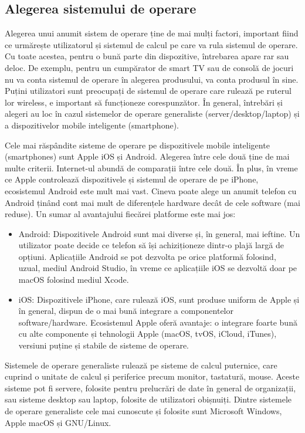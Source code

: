 \subsection{Alegerea sistemului de operare}
\label{sec:intro:pick}

Alegerea unui anumit sistem de operare ține de mai mulți factori, important fiind ce urmărește utilizatorul și sistemul de calcul pe care va rula sistemul de operare. Cu toate acestea, pentru o bună parte din dispozitive, întrebarea apare rar sau deloc. De exemplu, pentru un cumpărator de smart TV sau de consolă de jocuri nu va conta sistemul de operare în alegerea produsului, va conta produsul în sine. Puțini utilizatori sunt preocupați de sistemul de operare care rulează pe ruterul lor wireless, e important să funcționeze corespunzător. În general, întrebări și alegeri au loc în cazul sistemelor de operare generaliste (server/desktop/laptop) și a dispozitivelor mobile inteligente (smartphone).

Cele mai răspândite sisteme de operare pe dispozitivele mobile inteligente (smartphones) sunt Apple iOS și Android. Alegerea între cele două ține de mai multe criterii. Internet-ul abundă de comparații între cele două. În plus, în vreme ce Apple controlează dispozitivele și sistemul de operare de pe iPhone, ecosistemul Android este mult mai vast. Cineva poate alege un anumit telefon cu Android ținând cont mai mult de diferențele hardware decât de cele software (mai reduse). Un sumar al avantajului fiecărei platforme este mai jos:

\begin{itemize}
  \item Android: Dispozitivele Android sunt mai diverse și, în general, mai ieftine. Un utilizator poate decide ce telefon să își achiziționeze dintr-o plajă largă de opțiuni. Aplicațiile Android se pot dezvolta pe orice platformă folosind, uzual, mediul Android Studio, în vreme ce aplicațiile iOS se dezvoltă doar pe macOS folosind mediul Xcode.
  \item iOS: Dispozitivele iPhone, care rulează iOS, sunt produse uniform de Apple și în general, dispun de o mai bună integrare a componentelor software/hardware. Ecosistemul Apple oferă avantaje: o integrare foarte bună cu alte componente și tehnologii Apple (macOS, tvOS, iCloud, iTunes), versiuni puține și stabile de sisteme de operare.
\end{itemize}

Sistemele de operare generaliste rulează pe sisteme de calcul puternice, care cuprind o unitate de calcul și periferice precum monitor, tastatură, mouse. Aceste sisteme pot fi servere, folosite pentru prelucrări de date în general de organizații, sau sisteme desktop sau laptop, folosite de utilizatori obișnuiți. Dintre sistemele de operare generaliste cele mai cunoscute și folosite sunt Microsoft Windows, Apple macOS și GNU/Linux.

